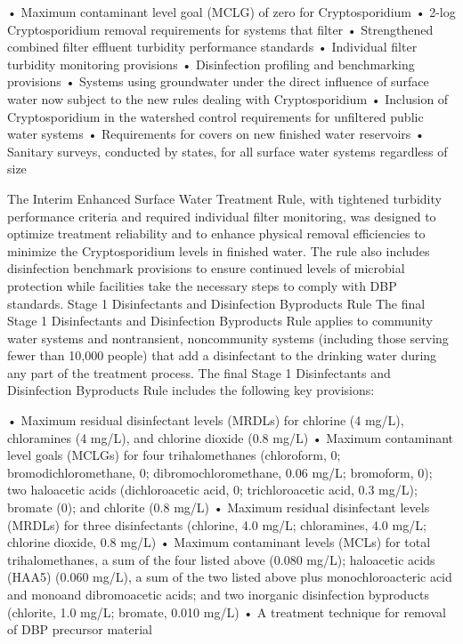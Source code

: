 \documentclass{article}
\begin{document}
• Maximum contaminant level goal (MCLG) of zero for Cryptosporidium •
2-log Cryptosporidium removal requirements for systems that filter •
Strengthened combined filter effluent turbidity performance standards •
Individual filter turbidity monitoring provisions • Disinfection
profiling and benchmarking provisions • Systems using groundwater under
the direct influence of surface water now subject to the new rules
dealing with Cryptosporidium • Inclusion of Cryptosporidium in the
watershed control requirements for unfiltered public water systems •
Requirements for covers on new finished water reservoirs • Sanitary
surveys, conducted by states, for all surface water systems regardless
of size

The Interim Enhanced Surface Water Treatment Rule, with tightened
turbidity performance criteria and required individual filter
monitoring, was designed to optimize treatment reliability and to
enhance physical removal efficiencies to minimize the Cryptosporidium
levels in finished water. The rule also includes disinfection benchmark
provisions to ensure continued levels of microbial protection while
facilities take the necessary steps to comply with DBP standards. Stage
1 Disinfectants and Disinfection Byproducts Rule The final Stage 1
Disinfectants and Disinfection Byproducts Rule applies to community
water systems and nontransient, noncommunity systems (including those
serving fewer than 10,000 people) that add a disinfectant to the
drinking water during any part of the treatment process. The final Stage
1 Disinfectants and Disinfection Byproducts Rule includes the following
key provisions:

• Maximum residual disinfectant levels (MRDLs) for chlorine (4 mg/L),
chloramines (4 mg/L), and chlorine dioxide (0.8 mg/L) • Maximum
contaminant level goals (MCLGs) for four trihalomethanes (chloroform, 0;
bromodichloromethane, 0; dibromochloromethane, 0.06 mg/L; bromoform, 0);
two haloacetic acids (dichloroacetic acid, 0; trichloroacetic acid, 0.3
mg/L); bromate (0); and chlorite (0.8 mg/L) • Maximum residual
disinfectant levels (MRDLs) for three disinfectants (chlorine, 4.0 mg/L;
chloramines, 4.0 mg/L; chlorine dioxide, 0.8 mg/L) • Maximum contaminant
levels (MCLs) for total trihalomethanes, a sum of the four listed above
(0.080 mg/L); haloacetic acids (HAA5) (0.060 mg/L), a sum of the two
listed above plus monochloroacteric acid and monoand dibromoacetic
acids; and two inorganic disinfection byproducts (chlorite, 1.0 mg/L;
bromate, 0.010 mg/L) • A treatment technique for removal of DBP
precursor material
\end{document}
